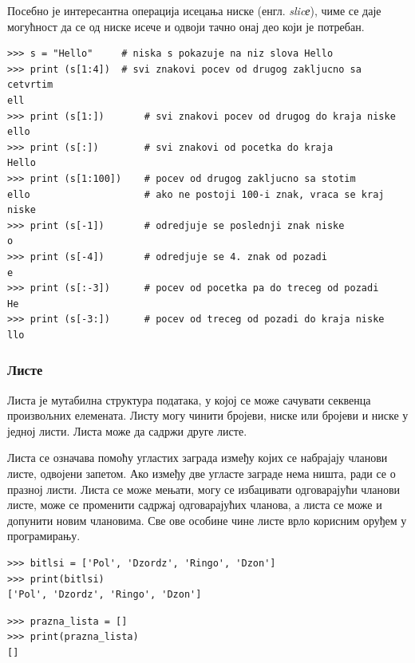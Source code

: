 Посебно је интересантна операција исецања ниске (енгл. \emph{slicе}), чиме се даје могућност да се од ниске исече и одвоји тачно онај део који је потребан.

\begin{lstlisting}[caption = Исецање ниске, label = slice]
>>> s = "Hello"     # niska s pokazuje na niz slova Hello
>>> print (s[1:4])  # svi znakovi pocev od drugog zakljucno sa cetvrtim
ell
>>> print (s[1:])       # svi znakovi pocev od drugog do kraja niske
ello
>>> print (s[:])        # svi znakovi od pocetka do kraja
Hello
>>> print (s[1:100])    # pocev od drugog zakljucno sa stotim
ello                    # ako ne postoji 100-i znak, vraca se kraj niske
>>> print (s[-1])       # odredjuje se poslednji znak niske
o
>>> print (s[-4])       # odredjuje se 4. znak od pozadi
e
>>> print (s[:-3])      # pocev od pocetka pa do treceg od pozadi
He
>>> print (s[-3:])      # pocev od treceg od pozadi do kraja niske
llo

\end{lstlisting}

\subsubsection{Листе}

Листа је мутабилна структура података, у којој се може сачувати секвенца произвољних елемената. Листу могу чинити бројеви, ниске или бројеви и ниске у једној листи. Листа може да садржи друге листе.

Листа се означава помоћу угластих заграда између којих се набрајају чланови листе, одвојени запетом. Ако између две угласте заграде нема ништа, ради се о празној листи. Листа се може мењати, могу се избацивати одговарајући чланови листе, може се променити садржај одговарајућих чланова, а листа се може и допунити новим члановима. Све ове особине чине листе врло корисним оруђем у програмирању.

\begin{lstlisting}[caption = Креирање листе, label = lista]
>>> bitlsi = ['Pol', 'Dzordz', 'Ringo', 'Dzon']
>>> print(bitlsi)
['Pol', 'Dzordz', 'Ringo', 'Dzon']
\end{lstlisting}

\begin{lstlisting}[caption = Креирање празне листе, label = prazna_lista]
>>> prazna_lista = []
>>> print(prazna_lista)
[]
\end{lstlisting}

